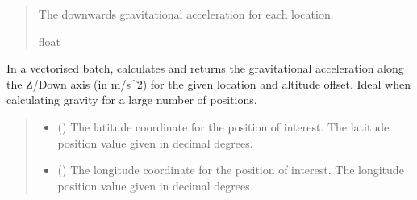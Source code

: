 \documentclass[letterpaper,10pt,english]{sphinxmanual}
\begin{document}
\begin{fulllineitems}
\begin{fulllineitems}
\begin{quote}
\begin{description}
\begin{itemize}
\end{itemize}

\sphinxAtStartPar
The downwards gravitational acceleration for each location.

\sphinxAtStartPar
float

\end{description}\end{quote}

\end{fulllineitems}


\begin{fulllineitems}
\label{\detokenize{modules/gravity/simple:qnav.gravity.simple.SimpleUniform.calc_gravity_z_vec}}
\pysigstartsignatures
{}
\pysigstopsignatures
\sphinxAtStartPar
In a vectorised batch, calculates and returns the gravitational
acceleration along the Z/Down axis (in m/s\textasciicircum{}2) for the given location
and altitude offset. Ideal when calculating gravity for a large
number of positions.
\begin{quote}\begin{description}
\begin{itemize}
\item {} 
\sphinxAtStartPar
{} () \textendash{} The latitude coordinate for the position of interest.
The latitude position value given in decimal degrees.

\item {} 
\sphinxAtStartPar
{} () \textendash{} The longitude coordinate for the position of interest.
The longitude position value given in decimal degrees.


\end{itemize}
\end{description}
\end{quote}
\end{fulllineitems}
\end{fulllineitems}
\end{document}
